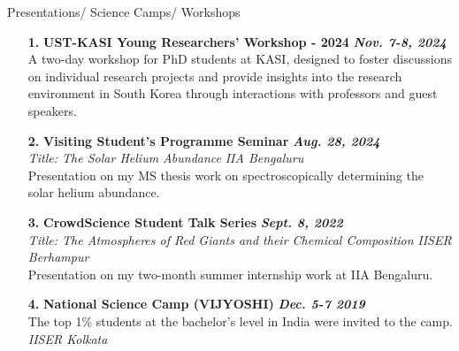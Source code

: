 \documentclass{resume} %
\begin{document}

\begin{rSection}{Presentations/ Science Camps/ Workshops}
\begin{enumerate}
    \item[\textbf{1.}] {\bf UST-KASI Young Researchers' Workshop - 2024} \hfill {\em \bf Nov. 7-8, 2024}\\
    A two-day workshop for PhD students at KASI, designed to foster discussions on individual research projects and provide insights into the research environment in South Korea through interactions with professors and guest speakers. 
    
    \item[\textbf{2.}] {\bf Visiting Student's Programme Seminar} \hfill {\em \bf Aug. 28, 2024}\\
    \textit{Title: The Solar Helium Abundance} \hfill {\em \textit{IIA Bengaluru}}\\
    Presentation on my MS thesis work on spectroscopically determining the solar helium abundance.
    
    \item[\textbf{3.}] {\bf CrowdScience Student Talk Series} \hfill {\em \bf Sept. 8, 2022}\\
    \textit{Title: The Atmospheres of Red Giants and their Chemical Composition} \hfill{\em \textit{IISER Berhampur}}\\
    Presentation on my two-month summer internship work at IIA Bengaluru.
    
    \item[\textbf{4.}] {\bf National Science Camp (VIJYOSHI)} \hfill {\em \bf Dec. 5-7 2019}\\
    The top 1\% students at the bachelor's level in India were invited to the camp. \hfill {\em \textit{IISER Kolkata}}
\end{enumerate}


\end{rSection}
\end{document}

